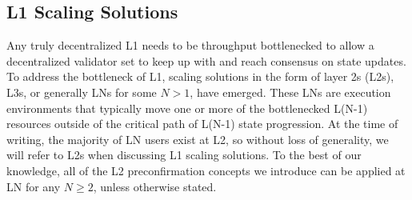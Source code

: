 \documentclass[a4paper]{article}
\theoremstyle{boldstyle}
\begin{document}
        


\subsection{L1 Scaling Solutions}\label{sec:intro_L2}

Any truly decentralized L1 needs to be throughput bottlenecked to allow a decentralized validator set to keep up with and reach consensus on state updates. To address the bottleneck of L1, scaling solutions in the form of layer 2s (L2s), L3s, or generally LNs for some $N>1$, have emerged. These LNs are execution environments that typically move one or more of the bottlenecked L(N-1) resources outside of the critical path of L(N-1) state progression. At the time of writing, the majority of LN users exist at L2, so without loss of generality, we will refer to L2s when discussing L1 scaling solutions. To the best of our knowledge, all of the L2 preconfirmation concepts we introduce can be applied at LN for any $N\geq 2$, unless otherwise stated.
\end{document}
